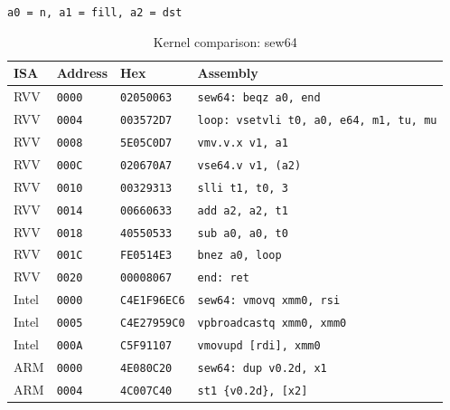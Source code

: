 \begin{table}[htbp]
\centering
\caption{Kernel comparison: sew64}
\begingroup
\scriptsize
\setlength{\tabcolsep}{4pt}
\noindent \texttt{a0 = n, a1 = fill, a2 = dst}\par
\vspace{0.6ex}
\begin{tabular}{@{}l|l|l|p{7.2cm}@{}}
\toprule
ISA & Address & Hex & Assembly \\
\midrule
RVV & \texttt{0000} & \texttt{02050063} & \texttt{sew64: beqz a0, end} \\
RVV & \texttt{0004} & \texttt{003572D7} & \texttt{loop: vsetvli t0, a0, e64, m1, tu, mu} \\
RVV & \texttt{0008} & \texttt{5E05C0D7} & \texttt{vmv.v.x v1, a1} \\
RVV & \texttt{000C} & \texttt{020670A7} & \texttt{vse64.v v1, (a2)} \\
RVV & \texttt{0010} & \texttt{00329313} & \texttt{slli t1, t0, 3} \\
RVV & \texttt{0014} & \texttt{00660633} & \texttt{add a2, a2, t1} \\
RVV & \texttt{0018} & \texttt{40550533} & \texttt{sub a0, a0, t0} \\
RVV & \texttt{001C} & \texttt{FE0514E3} & \texttt{bnez a0, loop} \\
RVV & \texttt{0020} & \texttt{00008067} & \texttt{end: ret} \\
\midrule
Intel & \texttt{0000} & \texttt{C4E1F96EC6} & \texttt{sew64: vmovq xmm0, rsi} \\
Intel & \texttt{0005} & \texttt{C4E27959C0} & \texttt{vpbroadcastq xmm0, xmm0} \\
Intel & \texttt{000A} & \texttt{C5F91107} & \texttt{vmovupd [rdi], xmm0} \\
\midrule
ARM & \texttt{0000} & \texttt{4E080C20} & \texttt{sew64: dup v0.2d, x1} \\
ARM & \texttt{0004} & \texttt{4C007C40} & \texttt{st1 \{v0.2d\}, [x2]} \\
\bottomrule
\end{tabular}
\endgroup
\end{table}
\noindent{}\par
